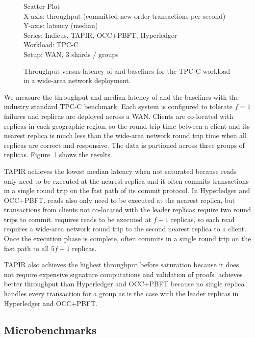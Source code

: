 \begin{figure}
  Scatter Plot\\
  X-axis: throughput (committed new order transactions per second)\\
  Y-axis: latency (median)\\
  Series: Indicus, TAPIR, OCC+PBFT, Hyperledger\\
  Workload: TPC-C\\
  Setup: WAN, 3 shards / groups\\
  \caption{Throughput versus latency of \sys{} and baselines for the TPC-C
  workload in a wide-area network deployment.}
  \label{fig:tpcc-tput-lat}
\end{figure}

We measure the throughput and median latency of \sys{} and the baselines with the
industry standard TPC-C benchmark. Each system is configured to tolerate $f=1$
failures and replicas are deployed across a WAN. Clients are co-located with
replicas in each geographic region, so the round trip time between a client and
its nearest replica is much less than the wide-area network round trip time when
all replicas are correct and responsive. The data is partioned across
three groups of replicas. Figure~\ref{fig:tpcc-tput-lat} shows the results.

TAPIR achieves the lowest median latency when not saturated because reads only
need to be executed at the nearest replica and it often commits transactions in
a single round trip on the fast path of its commit protocol. In Hyperledger and
OCC+PBFT, reads also only need to be executed at the nearest replica, but
transactions from clients not co-located with the leader replicas require two
round trips to commit. \sys{} requires reads to be executed at $f+1$ replicas,
so each read requires a wide-area network round trip to the second nearest
replica to a client. Once the execution phase is complete, \sys{} often commits
in a single round trip on the fast path to all $5f+1$ replicas.

TAPIR also achieves the highest throughput before saturation because it does not
require expensive signature computations and validation of proofs. \sys{} achieves
better throughput than Hyperledger and OCC+PBFT because no single replica handles
every transaction for a group as is the case with the leader replicas in Hyperledger
and OCC+PBFT.

\subsection{Microbenchmarks}


